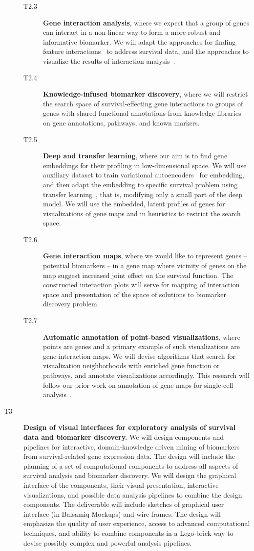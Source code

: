 \documentclass[11pt,a4paper]{article}
\renewcommand{\bold}{\textbf}
\begin{document}
\begin{description}
\begin{description}
		\item[T2.3] \bold{Gene interaction analysis}, where we expect that a group of genes can interact in a non-linear way to form a more robust and informative biomarker. We will adapt the approaches for finding feature interactions~\cite{} to address survival data, and the approaches to visualize the results of interaction analysis~\cite{}.
		\item[T2.4] \bold{Knowledge-infused biomarker discovery}, where we will restrict the search space of survival-effecting gene interactions to groups of genes with shared functional annotations from knowledge libraries on gene annotations, pathways, and known markers.
		\item[T2.5] \bold{Deep and transfer learning}, where our aim is to find gene embeddings for their profiling in low-dimensional space. We will use auxiliary dataset to train variational autoencoders~\cite{} for embedding, and then adapt the embedding to specific survival problem using transfer learning~\cite{}, that is, modifying only a small part of the deep model. We will use the embedded, latent profiles of genes for visualizations of gene maps and in heuristics to restrict the search space.
		\item[T2.6] \bold{Gene interaction maps}, where we would like to represent genes -- potential biomarkers -- in a gene map where vicinity of genes on the map suggest increased joint effect on the survival function. The constructed interaction plots will serve for mapping of interaction space and presentation of the space of solutions to biomarker discovery problem.
		\item[T2.7] \bold{Automatic annotation of point-based visualizations}, where points are genes and a primary example of such visualizations are gene interaction maps. We will devise algorithms that search for visualization neighborhoods with enriched gene function or pathways, and annotate visualizations accordingly. This research will follow our prior work on annotation of gene maps for single-cell analysis~\cite{}.
	\end{description}
	\item[T3] \bold{Design of visual interfaces for exploratory analysis of survival data and biomarker discovery.} We will design components and pipelines for interactive, domain-knowledge driven mining of biomarkers from survival-related gene expression data. The design will include the planning of a set of computational components to address all aspects of survival analysis and biomarker discovery. We will design the graphical interface of the components, their visual presentation, interactive visualizations, and possible data analysis pipelines to combine the design components. The deliverable will include sketches of graphical user interface (in Balsamiq Mockups) and wire-frames. The design will emphasize the quality of user experience, access to advanced computational techniques, and ability to combine components in a Lego-brick way to devise possibly complex and powerful analysis pipelines.

\end{description}
\end{document}
